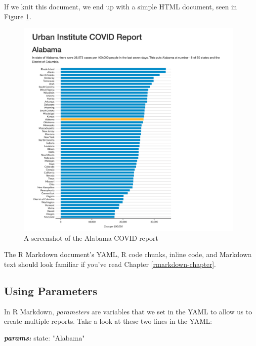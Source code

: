 \documentclass[
]{book}
\newenvironment{Shaded}{\begin{snugshade}}{\end{snugshade}}
\newcommand{\AnnotationTok}[1]{\textcolor[rgb]{0.56,0.35,0.01}{\textbf{\textit{#1}}}}
\newcommand{\NormalTok}[1]{#1}
\begin{document}
If we knit this document, we end up with a simple HTML document, seen in Figure \ref{fig:alabama-covid-report}.

\begin{figure}
\includegraphics[width=1\linewidth]{assets/alabama-covid-report} \caption{A screenshot of the Alabama COVID report}\label{fig:alabama-covid-report}
\end{figure}

The R Markdown document's YAML, R code chunks, inline code, and Markdown text should look familiar if you've read Chapter \ref{rmarkdown-chapter}.

\hypertarget{using-parameters}{%
\subsection*{Using Parameters}\label{using-parameters}}

In R Markdown, \emph{parameters} are variables that we set in the YAML to allow us to create multiple reports. Take a look at these two lines in the YAML:

\begin{Shaded}
\begin{Highlighting}[]
\AnnotationTok{params:}
\NormalTok{  state: "Alabama"}
\end{Highlighting}
\end{Shaded}
\end{document}

